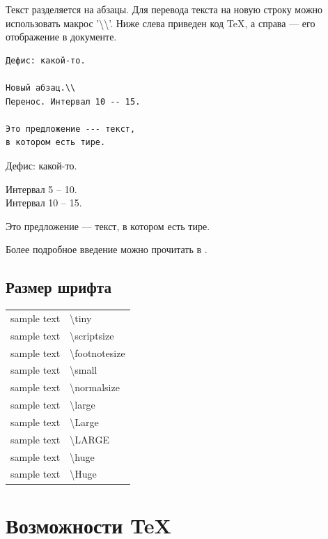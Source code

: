 Текст разделяется на абзацы.
Для перевода текста на новую строку можно использовать макрос '{\textbackslash}{\textbackslash}'.
Ниже слева приведен код TeX, а справа --- его отображение в документе.
\begin{multicols}{2}
\begin{verbatim}
Дефис: какой-то.

Новый абзац.\\
Перенос. Интервал 10 -- 15.

Это предложение --- текст,
в котором есть тире.
\end{verbatim}
  \columnbreak
Дефис: какой-то.

Интервал 5 -- 10.\\
Интервал 10 -- 15.

Это предложение --- текст,
в котором есть тире.
\end{multicols}

Более подробное введение можно прочитать в \cite{latexWikibook}.

\subsection{Размер шрифта}
\begin{center}
  \begin{tabular}{r|l}
    {\tiny sample text}         & \textbackslash tiny \\
    {\scriptsize sample text}   & \textbackslash scriptsize \\
    {\footnotesize sample text} & \textbackslash footnotesize \\
    {\small sample text}        & \textbackslash small \\
    {\normalsize sample text}   & \textbackslash normalsize \\
    {\large sample text}        & \textbackslash large \\
    {\Large	sample text}        & \textbackslash Large \\
    {\LARGE	sample text}        & \textbackslash LARGE \\
    {\huge	sample text}        & \textbackslash huge \\
    {\Huge sample text}         & \textbackslash Huge
  \end{tabular}
\end{center}

\section{Возможности TeX}
